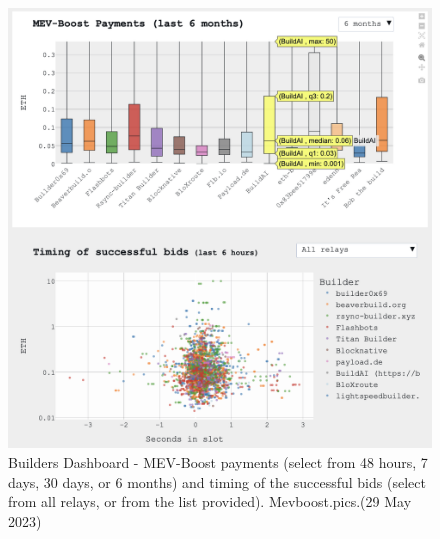 \documentclass[UTF8]{article}
\begin{document}
{\begin{figure}[htbp]
\begin{center}
\includegraphics[width=0.9\linewidth]{images/mevbuilder3}
\caption{Builders Dashboard - MEV-Boost payments (select from 48 hours, 7 days, 30 days, or 6 months) and timing of the successful bids (select from all relays, or from the list provided). Mevboost.pics.(29 May 2023)}
\label{fig:mevbuilder3}
\end{center}
\end{figure}

}
\end{document}
